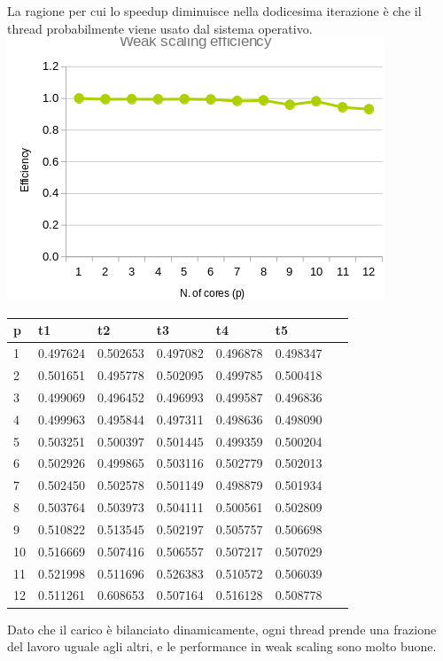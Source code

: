 \documentclass[a4paper,12pt, twoside]{report}
\begin{document}
La ragione per cui lo speedup diminuisce nella dodicesima iterazione è che il thread probabilmente viene usato dal sistema operativo.
\newline
\newline
\includegraphics[scale=0.5]{images/omp_weak.png}
\begin{table}[!ht]
    \centering
    \begin{tabular}{|l|l|l|l|l|l|l|}
    \hline
        p & t1 & t2 & t3 & t4 & t5 & ~ \\ \hline
        1 & 0.497624 & 0.502653 & 0.497082 & 0.496878 & 0.498347 & ~ \\ \hline
        2 & 0.501651 & 0.495778 & 0.502095 & 0.499785 & 0.500418 & ~ \\ \hline
        3 & 0.499069 & 0.496452 & 0.496993 & 0.499587 & 0.496836 & ~ \\ \hline
        4 & 0.499963 & 0.495844 & 0.497311 & 0.498636 & 0.498090 & ~ \\ \hline
        5 & 0.503251 & 0.500397 & 0.501445 & 0.499359 & 0.500204 & ~ \\ \hline
        6 & 0.502926 & 0.499865 & 0.503116 & 0.502779 & 0.502013 & ~ \\ \hline
        7 & 0.502450 & 0.502578 & 0.501149 & 0.498879 & 0.501934 & ~ \\ \hline
        8 & 0.503764 & 0.503973 & 0.504111 & 0.500561 & 0.502809 & ~ \\ \hline
        9 & 0.510822 & 0.513545 & 0.502197 & 0.505757 & 0.506698 & ~ \\ \hline
        10 & 0.516669 & 0.507416 & 0.506557 & 0.507217 & 0.507029 & ~ \\ \hline
        11 & 0.521998 & 0.511696 & 0.526383 & 0.510572 & 0.506039 & ~ \\ \hline
        12 & 0.511261 & 0.608653 & 0.507164 & 0.516128 & 0.508778 & ~ \\ \hline
    \end{tabular}
\end{table}
\newline
Dato che il carico è bilanciato dinamicamente, ogni thread prende una frazione del lavoro uguale agli altri, 
e le performance in weak scaling sono molto buone.
\end{document}
